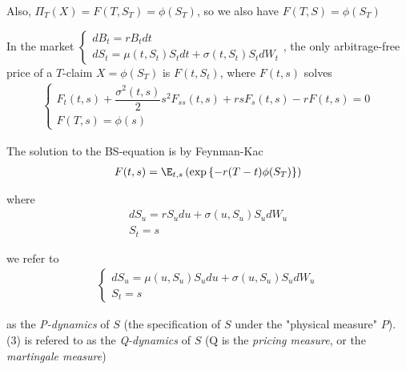 \noindent Also, $\Pi_T(X) = F(T,S_T) = \phi(S_T)$, so we also have $F(T,S) =\phi(S_T)$
\par\bigskip
\begin{theo}{}
  In the market $\begin{cases}
    dB_t = rB_t dt\\
    dS_t = \mu(t,S_t)S_tdt + \sigma(t,S_t)S_tdW_t
  \end{cases}$, the only arbitrage-free price of a $T$-claim $X = \phi(S_T)$ is $F(t,S_t)$, where $F(t,s)$ solves
  \begin{equation*}
    \begin{gathered}
      \begin{cases}
        F_t(t,s)+\dfrac{\sigma^2(t,s)}{2}s^2F_{ss}(t,s)+rsF_s(t,s)-rF(t,s) =0\\
        F(T,s) = \phi(s)
      \end{cases}
    \end{gathered}
  \end{equation*}
\end{theo}
\par\bigskip
\noindent The solution to the BS-equation is by Feynman-Kac
\begin{equation*}
  \begin{gathered}
    F(t,s) = \E_{t,s}\left(\text{exp}\left\{-r(T-t)\phi(S_T)\right\}\right)
  \end{gathered}
\end{equation*}\par
\noindent where 
\begin{equation}
  \begin{gathered}
    dS_u = rS_udu+\sigma(u,S_u)S_udW_u\\
    S_t = s
  \end{gathered}
\end{equation}\par
\noindent we refer to 
\begin{equation}
  \begin{gathered}
    \begin{cases}
      dS_u = \mu(u,S_u)S_u du+\sigma(u,S_u)S_udW_u\\
      S_t = s
    \end{cases}
  \end{gathered}
\end{equation}\par
\noindent as the \textit{P-dynamics} of $S$ (the specification of $S$ under the "physical measure" $P$). (3) is refered to as the \textit{Q-dynamics} of $S$ (Q is the \textit{pricing measure}, or the \textit{martingale measure})
